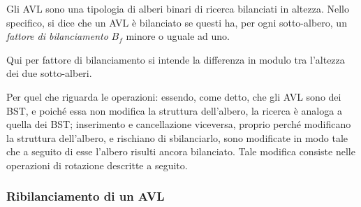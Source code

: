\documentclass{subfiles}
\begin{document}
Gli AVL sono una tipologia di alberi binari di ricerca bilanciati in altezza.
Nello specifico, si dice che un AVL è bilanciato se questi ha, per ogni sotto-albero, un \emph{fattore di bilanciamento} \(B_{f}\) minore o uguale ad uno.
\begin{MarginNote}
    Qui per fattore di bilanciamento si intende la differenza in modulo tra l'altezza dei due sotto-alberi.
\end{MarginNote}

Per quel che riguarda le operazioni: essendo, come detto, che gli AVL sono dei BST, e poiché essa non modifica la struttura dell'albero,
la ricerca è analoga a quella dei BST; inserimento e cancellazione viceversa, proprio perché modificano la struttura dell'albero,
e rischiano di sbilanciarlo, sono modificate in modo tale che a seguito di esse l'albero risulti ancora bilanciato.
Tale modifica consiste nelle operazioni di rotazione descritte a seguito.

\subsubsection{Ribilanciamento di un AVL}

\end{document}
